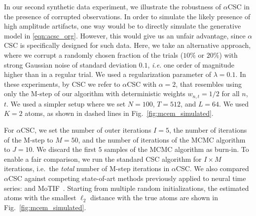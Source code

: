 In our second synthetic data experiment, we illustrate the robustness of $\alpha$CSC in the presence of corrupted observations.
%
In order to simulate the likely presence of high amplitude artifacts, one way would be to directly simulate the generative model in \eqref{eqn:acsc_org}. However, this would give us an unfair advantage, since $\alpha$CSC is specifically designed for such data. Here, we take an alternative approach, where we corrupt a randomly chosen fraction of the trials ($10\%$ or $20\%$) with strong Gaussian noise of standard deviation $0.1$, \textit{i.e.} one order of magnitude higher than in a regular trial. We used a regularization parameter of $\lambda = 0.1$.
%
In these experiments, by CSC we refer to $\alpha$CSC with $\alpha=2$, that resembles using only the M-step of our algorithm with deterministic weights $w_{n,t}=1/2$ for all $n$, $t$. We used a simpler setup where we set $N=100$, $T=512$, and $L=64$. We used $K=2$ atoms, as shown in dashed lines in Fig.~\ref{fig:mcem_simulated}.

%

%
For $\alpha$CSC, we set the number of outer iterations $I=5$, the number of iterations of the M-step to $M=50$, and the number of iterations of the MCMC algorithm to $J=10$. We discard the first $5$ samples of the MCMC algorithm as burn-in.
%
%
To enable a fair comparison, we run the standard CSC algorithm for $I\times M$ iterations, i.e.\ the \emph{total} number of M-step iterations in $\alpha$CSC. We also compared $\alpha$CSC against competing state-of-art methods previously applied to neural time series: \citet{brockmeier2016learning} and MoTIF~\citep{jost2006motif}. 
%
Starting from multiple random initializations, the estimated atoms with the smallest $\ell_2$ distance with the true atoms are shown in Fig.~\ref{fig:mcem_simulated}.

